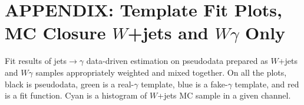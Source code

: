 \section{APPENDIX:  Template Fit Plots, MC Closure $W$+jets and $W\gamma$ Only}
\label{sec:TemplateFitPlotsMCclosureWjetsPlusWg}

Fit results of jets$ \rightarrow \gamma$ data-driven estimation on pseudodata prepared as $W$+jets and $W\gamma$ samples appropriately weighted and mixed together. On all the plots, black is pseudodata, green is a real-$\gamma$ template, blue is a fake-$\gamma$ template, and red is a fit function. Cyan is a histogram of $W$+jets MC sample in a given channel. 


